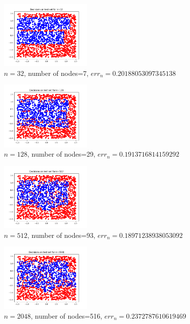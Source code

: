 \documentclass[a4paper]{article}
\theoremstyle{definition}
\begin{document}
\begin{enumerate}
\begin{figure}[h!]
	\centering
	\includegraphics[width=0.4\textwidth]{data/n32.png}
	\captionsetup{labelformat=empty}
	\caption{$ n=32 $, number of nodes=7, $ err_n=0.20188053097345138 $}
	\label{fig:fig3}
\end{figure}

\begin{figure}[h!]
	\centering
	\includegraphics[width=0.4\textwidth]{data/n128.png}
	\captionsetup{labelformat=empty}
	\caption{$ n=128 $, number of nodes=29, $ err_n=0.1913716814159292 $}
	\label{fig:fig4}
\end{figure}

\begin{figure}[h!]
	\centering
	\includegraphics[width=0.4\textwidth]{data/n512.png}
	\caption{$ n=512 $, number of nodes=93, $ err_n=0.18971238938053092 $}
	\label{fig:fig5}
\end{figure}

\begin{figure}[h!]
	\centering
	\includegraphics[width=0.4\textwidth]{data/n2048.png}
	\caption{$ n=2048 $, number of nodes=516, $ err_n=0.2372787610619469 $}
	\label{fig:fig6}
\end{figure}


\end{enumerate}
\end{document}
